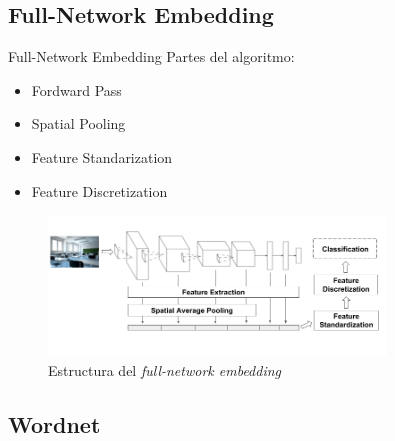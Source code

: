 \documentclass{beamer}
\begin{document}
\subsection{Full-Network Embedding}

\begin{frame}{Full-Network Embedding}
Partes del algoritmo: 
\begin{itemize}
\item Fordward Pass
\item Spatial Pooling
\item Feature Standarization
\item Feature Discretization
\end{itemize}
\begin{figure}[h]
\label{fig:fne}
\centering
\includegraphics[width = 0.8\textwidth]{Images/cropfne.png} 
\caption{Estructura del \textit{full-network embedding}\label{fig:fnediagram}}
\end{figure}

\end{frame}
\subsection{Wordnet}
\end{document}
